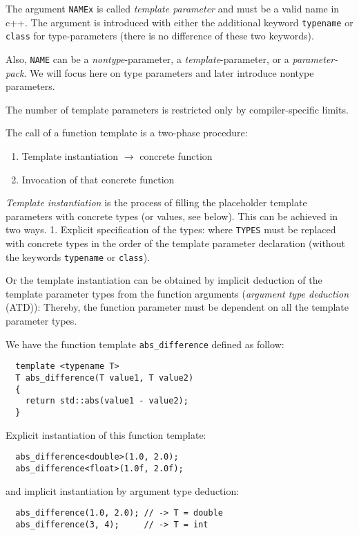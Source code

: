The argument \texttt{NAMEx} is called \emph{template parameter} and must be a valid name in c++. The argument is introduced with either the
additional keyword \texttt{typename} or \texttt{class} for type-parameters (there is no difference of these two keywords).

\begin{rem}
  Also, \texttt{NAME} can be a \emph{nontype}-parameter, a \emph{template}-parameter, or a \emph{parameter-pack}. We will focus here on type parameters and later introduce nontype parameters.
\end{rem}

\begin{rem}
  The number of template parameters is restricted only by compiler-specific limits.
\end{rem}

The call of a function template is a two-phase procedure:
\begin{enumerate}
  \item Template instantiation $\rightarrow$ concrete function
  \item Invocation of that concrete function
\end{enumerate}

\emph{Template instantiation} is the process of filling the placeholder template parameters with concrete types (or values, see below). This can be achieved
in two ways. 1. Explicit specification of the types:
%
%
where \texttt{TYPES} must be replaced with concrete types in the order of the template parameter declaration (without the keywords \texttt{typename} or
\texttt{class}).

Or the template instantiation can be obtained by implicit deduction of the template parameter types from the function arguments
(\emph{argument type deduction} (ATD)):
%
%
Thereby, the function parameter must be dependent on all the template parameter types.

\begin{example}
  We have the function template \texttt{abs\_difference} defined as follow:
  \begin{verbatim}
  template <typename T>
  T abs_difference(T value1, T value2)
  {
    return std::abs(value1 - value2);
  }
  \end{verbatim}
  Explicit instantiation of this function template:
  \begin{verbatim}
  abs_difference<double>(1.0, 2.0);
  abs_difference<float>(1.0f, 2.0f);
  \end{verbatim}
  and implicit instantiation by argument type deduction:
  \begin{verbatim}
  abs_difference(1.0, 2.0); // -> T = double
  abs_difference(3, 4);     // -> T = int
  \end{verbatim}
\end{example}

